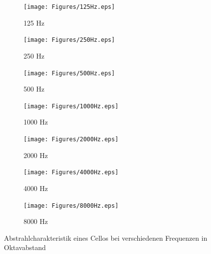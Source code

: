 \begin{figure}[h!]
    \centering
    \begin{subfigure}{.5\textwidth}
        \centering
        \caption{125 Hz}
        \texttt{[image: Figures/125Hz.eps]}
    \end{subfigure}%
    \begin{subfigure}{.5\textwidth}
        \centering
        \caption{250 Hz}
        \texttt{[image: Figures/250Hz.eps]}
    \end{subfigure}

    \vspace{0.5cm}
    \begin{subfigure}{.5\textwidth}
        \centering
        \caption{500 Hz}
        \texttt{[image: Figures/500Hz.eps]}
    \end{subfigure}%
    \begin{subfigure}{.5\textwidth}
        \centering
        \caption{1000 Hz}
        \texttt{[image: Figures/1000Hz.eps]}
    \end{subfigure}

    \vspace{0.5cm}
    \begin{subfigure}{.5\textwidth}
        \centering
        \caption{2000 Hz}
        \texttt{[image: Figures/2000Hz.eps]}
    \end{subfigure}%
    \begin{subfigure}{.5\textwidth}
        \centering
        \caption{4000 Hz}
        \texttt{[image: Figures/4000Hz.eps]}
    \end{subfigure}

    \vspace{0.5cm}
    \begin{subfigure}{.5\textwidth}
        \centering
        \caption{8000 Hz}
        \texttt{[image: Figures/8000Hz.eps]}
    \end{subfigure}

    \caption{Abstrahlcharakteristik eines Cellos bei verschiedenen Frequenzen in Oktavabstand}
    \label{fig:balloon}
\end{figure}


